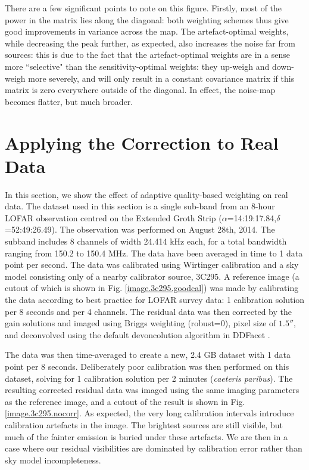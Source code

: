 \pg
There are a few significant points to note on this figure. Firstly, most of the power in the matrix lies along the diagonal: both weighting schemes thus give good improvements in variance across the map. The artefact-optimal weights, while decreasing the peak further, as expected, also increases the noise far from sources: this is due to the fact that the artefact-optimal weights are in a sense more ``selective" than the sensitivity-optimal weights: they up-weigh and down-weigh more severely, and will only result in a constant covariance matrix if this matrix is zero everywhere outside of the diagonal. {In effect, the noise-map becomes flatter, but much broader.}

\section{Applying the Correction to Real Data}





\pg
In this section, we show the effect of adaptive quality-based weighting on real data. The dataset used in this section is a single sub-band from an 8-hour LOFAR observation centred on the Extended Groth Strip ($\alpha$=14:19:17.84,$\delta$=52:49:26.49). The observation was performed on August 28th, 2014. The subband includes 8 channels of width 24.414 kHz each, for a total bandwidth ranging from 150.2 to 150.4 MHz. The data have been averaged in time to 1 data point per second. The data was calibrated using Wirtinger calibration \citep[see][and references therein]{2014arXiv1410.8706T,2015MNRAS.449.2668S} and a sky model consisting only of a nearby calibrator source, 3C295. A reference image (a cutout of which is shown in Fig. \ref{image.3c295.goodcal}) was made by calibrating the data according to best practice for LOFAR survey data: 1 calibration solution per 8 seconds and per 4 channels. {The residual data was then corrected by the gain solutions and imaged} using Briggs weighting (robust=0), pixel size of $1.5''$, and deconvolved using the default devoncolution algorithm in DDFacet .

\pg
The data was then time-averaged to create a new, 2.4 GB dataset with 1 data point per 8 seconds. Deliberately poor calibration was then performed on this dataset, solving for 1 calibration solution per 2 minutes ({\it caeteris paribus}). The resulting corrected residual data was imaged using the same imaging parameters as the reference image, and a cutout of the result is shown in Fig. \ref{image.3c295.nocorr}. As expected, the very long calibration intervals introduce calibration artefacts in the image. The brightest sources are still visible, but much of the fainter emission is buried under these artefacts. We are then in a case where our residual visibilities are dominated by calibration error rather than sky model incompleteness.

